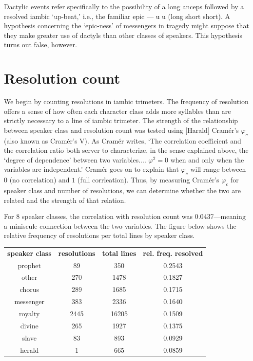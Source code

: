 \documentclass[
]{ceurart}
\begin{document}
\noindent
Dactylic events refer specifically to the possibility of a long anceps
followed by a resolved iambic `up-beat,' i.e., the familiar epic — u u
(long short short). A hypothesis concerning the `epic-ness' of messengers
in tragedy might suppose that they make greater use of dactyls than other
classes of speakers. This hypothesis turns out false, however.


\section{Resolution count}

We begin by counting resolutions in iambic trimeters. The frequency of
resolution offers a sense of how often each character class adds more
syllables than are strictly necessary to a line of iambic trimeter. The
strength of the relationship between speaker class and resolution count was
tested using [Harald] Cramér's $φ_c$ (also known as Cramér's V). As Cramér
writes, `The correlation coefficient and the correlation ratio both server
to characterize, in the sense explained above, the `degree of dependence'
between two variables.... $φ^2 = 0$ when and only when the variables are
independent.' \cite[282]{Cramer2016} Cramér goes on to explain that $φ_c$
will range between \(0\) (no correlation) and \(1\) (full corrleation). Thus,
by measuring Cramér's $φ_c$ for speaker class and number of resolutions, we
can determine whether the two are related and the strength of that relation.

For 8 speaker classes, the correlation with resolution count was
0.0437---meaning a miniscule connection between the two variables. The figure
below shows the relative frequency of resolutions per total lines by speaker
class.

\begin{center}
\begin{tabular}{c | c | c | c}
\textbf{speaker class} & \textbf{resolutions} & \textbf{total lines} & \textbf{rel. freq. resolved} \\
prophet & 89 & 350 & 0.2543 \\
other & 270 & 1478 & 0.1827 \\
chorus & 289 & 1685 & 0.1715 \\
messenger & 383 & 2336 & 0.1640 \\
royalty & 2445 & 16205 & 0.1509 \\
divine & 265 & 1927 & 0.1375 \\
slave & 83 & 893 & 0.0929 \\
herald & 1 & 665 & 0.0859
\end{tabular}
\end{center}
\end{document}
